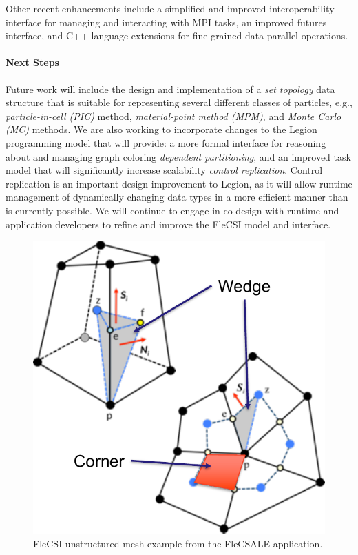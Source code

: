 Other recent enhancements include a simplified and improved
interoperability interface for managing and interacting with MPI tasks,
an improved futures interface, and C++ language extensions for
fine-grained data parallel operations.

\paragraph{Next Steps}

Future work will include the design and implementation of a
\textit{set topology} data structure that is suitable for representing
several different classes of particles, e.g., \textit{particle-in-cell
(PIC)} method, \textit{material-point method (MPM)}, and
\textit{Monte Carlo (MC)} methods. We are also working to incorporate
changes to the Legion programming model that will provide: a more formal
interface for reasoning about and managing graph coloring
\textit{dependent partitioning}, and an improved task model that will
significantly increase scalability \textit{control replication}.
Control replication is an important design improvement to Legion, as it
will allow runtime management of dynamically changing data types in a
more efficient manner than is currently possible. We will continue to
engage in co-design with runtime and application developers to refine
and improve the FleCSI model and interface.

\begin{figure}
  \centering
  \includegraphics[scale=0.6]{projects/2.3.3-MathLibs/2.3.3.02-LANL-ATDM-MathLibs/mesh.pdf}
  \caption{FleCSI unstructured mesh example from the FleCSALE application.}
  \label{fig:mesh}
\end{figure}
